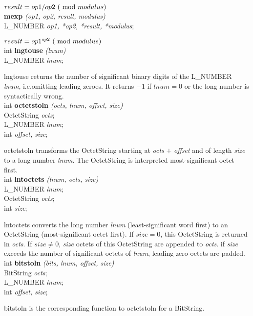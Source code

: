 $result = op1 / op2\ (\ {\rm mod }\ modulus )$
\\ [1ex]

{\bf mexp} {\em (op1, op2, result, modulus)} \\
L\_NUMBER {\em *op1, *op2, *result, *modulus};

$result = {op1}^{op2}\ (\ {\rm mod }\ modulus )$
\\ [1ex]

int {\bf lngtouse} {\em (lnum)} \\
L\_NUMBER {\em *lnum}; 

lngtouse returns the number of significant binary digits of the L\_NUMBER {\em lnum},
i.e.omitting leading zeroes. It returns $-1$ if $lnum=0$ or the long number is syntactically wrong.
\\ [1ex]


int {\bf octetstoln} {\em (octs, lnum, offset, size)} \\
OctetString {\em *octs}; \\
L\_NUMBER {\em *lnum}; \\
int {\em offset, size}; 

octetstoln transforms the OctetString starting at {\em octs} $+$ {\em offset} 
and of length {\em size} to a long number {\em lnum}. The OctetString is
interpreted most-significant octet first.
\\ [1ex]

int {\bf lntoctets} {\em (lnum, octs, size)} \\
L\_NUMBER {\em *lnum}; \\
OctetString {\em *octs}; \\
int {\em size}; 

lntoctets converts the long number {\em lnum} (least-significant word first) 
to an OctetString (most-significant octet first). 
If $size=0$, this OctetString is returned in {\em octs}.
If $size\neq 0$, {\em size} octets of this OctetString are appended to {\em octs}.
if {\em size} exceeds the number of significant octets of {\em lnum}, leading
zero-octets are padded.
\\ [1ex]

int {\bf bitstoln} {\em (bits, lnum, offset, size)} \\
BitString {\em *octs}; \\
L\_NUMBER {\em *lnum}; \\
int {\em offset, size}; 

bitstoln is the corresponding function to octetstoln for a BitString.
\\ [1ex]


